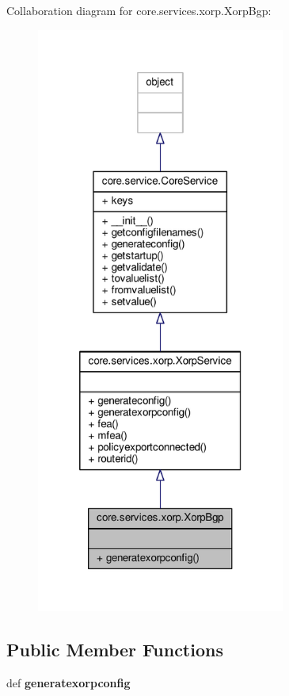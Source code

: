 Collaboration diagram for core.\+services.\+xorp.\+Xorp\+Bgp\+:
\nopagebreak
\begin{figure}[H]
\begin{center}
\leavevmode
\includegraphics[height=550pt]{classcore_1_1services_1_1xorp_1_1_xorp_bgp__coll__graph}
\end{center}
\end{figure}
\subsection*{Public Member Functions}
\begin{DoxyCompactItemize}
\item 
\hypertarget{classcore_1_1services_1_1xorp_1_1_xorp_bgp_a7f1c9d0c7735113f7089be952e37b718}{def {\bfseries generatexorpconfig}}\label{classcore_1_1services_1_1xorp_1_1_xorp_bgp_a7f1c9d0c7735113f7089be952e37b718}

\end{DoxyCompactItemize}
